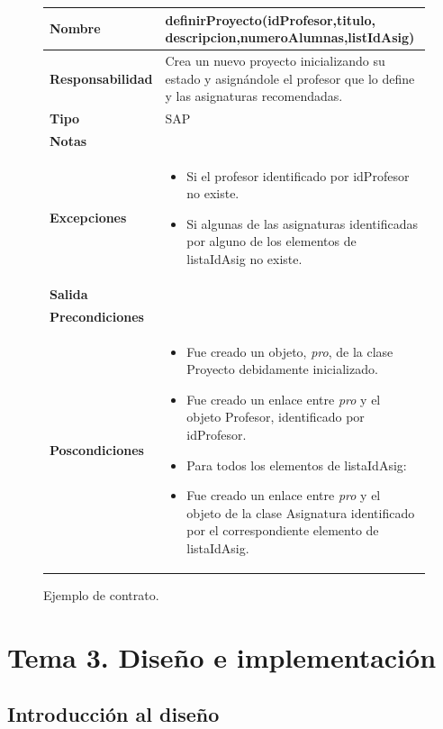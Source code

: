 \documentclass[12pt,spanish]{article}
\begin{document}
\begin{figure}[H]
\centering
\begin{tabular}{|m{7.5cm}|m{7.5cm}|}
\hline
\textbf{Nombre} & \textbf{definirProyecto}(idProfesor,titulo,
descripcion,numeroAlumnas,listIdAsig)\\
\hline
\textbf{Responsabilidad} & Crea un nuevo proyecto inicializando su estado y asignándole el profesor que lo define y las asignaturas recomendadas.\\
\hline
\textbf{Tipo} & SAP\\
\hline
\textbf{Notas} &  \\
\hline
\textbf{Excepciones} & 
\begin{itemize}
	\item Si el profesor identificado por idProfesor no existe.
	\item Si algunas de las asignaturas identificadas por alguno de los elementos de listaIdAsig no existe.
\end{itemize} \\
\hline
\textbf{Salida} &\\
\hline
\textbf{Precondiciones} & \\
\hline
\textbf{Poscondiciones} & 
\begin{itemize}
	\item Fue creado un objeto, \emph{pro}, de la clase Proyecto debidamente inicializado.
	\item Fue creado un enlace entre \emph{pro} y el objeto Profesor, identificado por idProfesor.
	\item Para todos los elementos de 
	listaIdAsig:
	\item \quad Fue creado un enlace entre \emph{pro} y el objeto de la clase Asignatura identificado por el correspondiente elemento de listaIdAsig.
\end{itemize}
\\
\hline
\end{tabular}
\caption{Ejemplo de contrato.}
\end{figure}

\newpage

\section{Tema 3. Diseño e implementación}

\subsection{Introducción al diseño}
\end{document}
